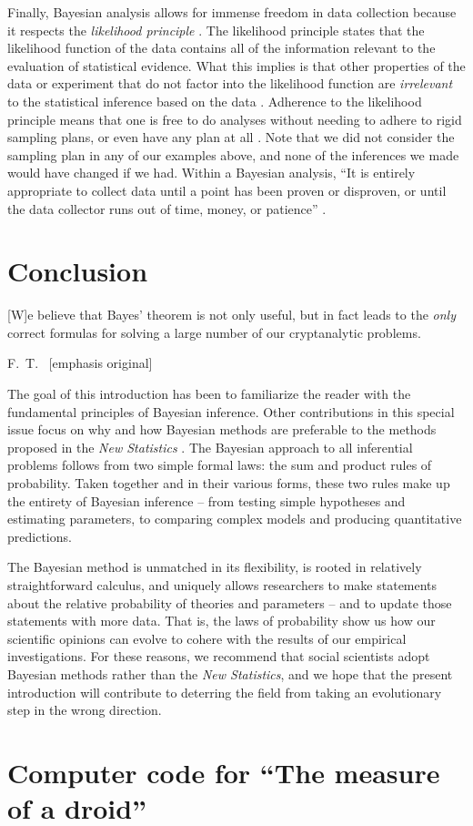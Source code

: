 Finally, Bayesian analysis allows for immense freedom in data collection because it respects the \textit{likelihood principle} \cite{BergerWolpert1988}. The likelihood principle states that the likelihood function of the data contains all of the information relevant to the evaluation of statistical evidence. What this implies is that other properties of the data or experiment that do not factor into the likelihood function are \textit{irrelevant} to the statistical inference based on the data \cite{Lindley1993,Royall1997}. Adherence to the likelihood principle means that one is free to do analyses without needing to adhere to rigid sampling plans, or even have any plan at all \cite{Rouder2014PBR}. Note that we did not consider the sampling plan in any of our examples above, and none of the inferences we made would have changed if we had. Within a Bayesian analysis, ``It is entirely appropriate to collect data until a point has been proven or disproven, or until the data collector runs out of time, money, or patience'' \cite[p.\ 193]{EdwardsEtAl1963}. 

\section*{Conclusion}
\epigraph{[W]e believe that Bayes' theorem is not only useful, but in fact leads to the \emph{only} correct formulas for solving a large number of our cryptanalytic problems.}{F.~T.~ [emphasis original]}

\noindent The goal of this introduction has been to familiarize the reader with the fundamental principles of Bayesian inference. Other contributions in this special issue \cite{DienesSI,KruschkeSI2} focus on why and how Bayesian methods are preferable to the methods proposed in the \textit{New Statistics} \cite{Cumming2014}. The Bayesian approach to all inferential problems follows from two simple formal laws: the sum and product rules of probability. Taken together and in their various forms, these two rules make up the entirety of Bayesian inference -- from testing simple hypotheses and estimating parameters, to comparing complex models and producing quantitative predictions.

The Bayesian method is unmatched in its flexibility, is rooted in relatively straightforward calculus, and uniquely allows researchers to make statements about the relative probability of theories and parameters -- and to update those statements with more data. That is, the laws of probability show us how our scientific opinions can evolve to cohere with the results of our empirical investigations. For these reasons, we recommend that social scientists adopt Bayesian methods rather than the \textit{New Statistics}, and we hope that the present introduction will contribute to deterring the field from taking an evolutionary step in the wrong direction. 

\null
\newpage

\appendix
\section*{Computer code for ``The measure of a droid''} \label{app:droid}
 



